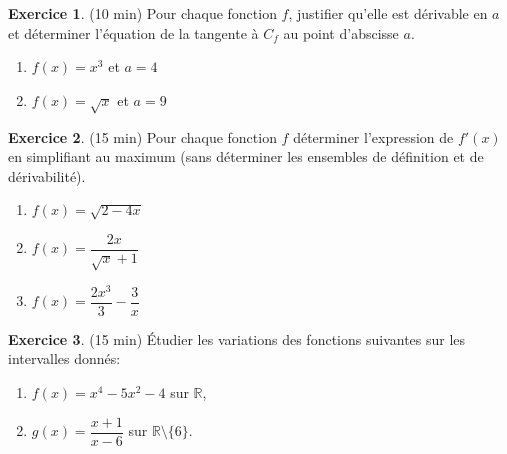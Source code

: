 \documentclass{exam}
\theoremstyle{definition}
\newtheorem{exercice}{Exercice}
\begin{document}
\begin{exercice}{(10 min)}
    Pour chaque fonction $f$, justifier qu’elle est dérivable en $a$ et déterminer l’équation de la tangente à $C_f$ au point d’abscisse $a$.
    \begin{enumerate}
        \item $f(x) = x^3$ et $a = 4$
        \item $f(x) = \sqrt{x}$ et $a = 9$
    \end{enumerate}
    \end{exercice}
    
    \begin{exercice}{(15 min)}
    Pour chaque fonction $f$ déterminer l'expression de $f'(x)$ en simplifiant au maximum (sans déterminer les ensembles de définition et de dérivabilité).
    \begin{enumerate}
        \item $f(x) = \sqrt{2 - 4x}$
        \item $f(x) = \dfrac{2x}{\sqrt{x} + 1}$
        \item $f(x) = \dfrac{2x^3}{3} - \dfrac{3}{x}$
    \end{enumerate}
    \end{exercice}
\begin{exercice}{(15 min)}
Étudier les variations des fonctions suivantes sur les intervalles donnés:
\begin{enumerate}
    \item $f(x) = x^4 - 5x^2 - 4$ sur $\mathbb{R}$,
    \item $g(x) = \dfrac{x+1}{x-6}$ sur $\mathbb{R} \setminus \{6\}$.
\end{enumerate}
\end{exercice}
\end{document}
